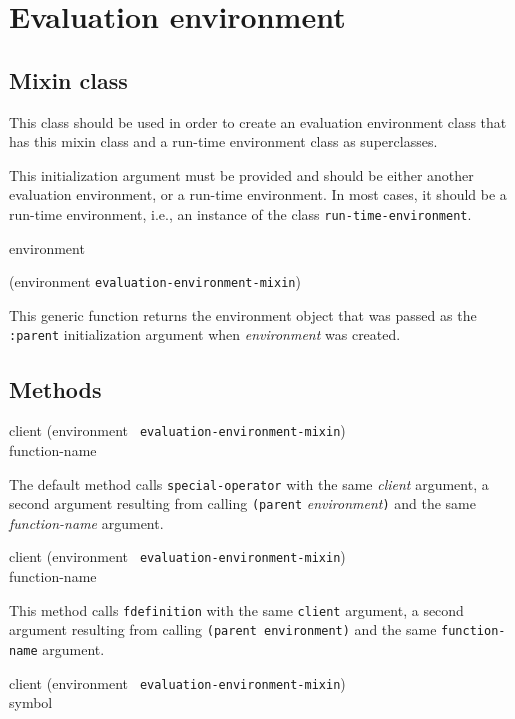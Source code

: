 \chapter{Evaluation environment}

\section{Mixin class}


This class should be used in order to create an evaluation environment
class that has this mixin class and a run-time environment class as
superclasses.


This initialization argument must be provided and should be either
another evaluation environment, or a run-time environment.  In most
cases, it should be a run-time environment, i.e., an instance of the
class \texttt{run-time-environment}.

 {environment}

 {(environment {\tt evaluation-environment-mixin})}

This generic function returns the environment object that was passed
as the \texttt{:parent} initialization argument when
\textit{environment} was created.

\section{Methods}

{\small{} {client (environment {\tt
      evaluation-environment-mixin}) \\ function-name}
}

The default method calls \texttt{special-operator} with the same
\textit{client} argument, a second argument resulting from calling
\texttt{(parent} \textit{environment}\texttt{)} and the same
\textit{function-name} argument.

{\small{} {client (environment {\tt
      evaluation-environment-mixin}) \\ function-name}
}

This method calls \texttt{fdefinition} with the same \texttt{client} argument,
a second argument resulting from calling \texttt{(parent environment)} and the
same \texttt{function-name} argument.

{\small{} {client (environment {\tt
      evaluation-environment-mixin}) \\ symbol}
}

